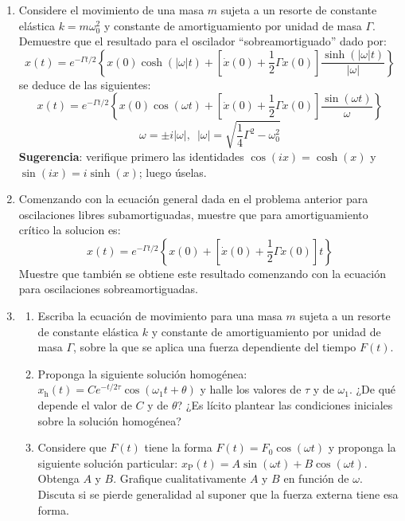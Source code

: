 \documentclass[11pt,spanish]{article}
\begin{document}
\begin{enumerate}
\begin{enumerate}
    \end{enumerate}



    \item Considere el movimiento de una masa $m$ sujeta a un resorte
    de constante elástica $k=m\omega_{0}^{2}$ y constante de
    amortiguamiento por unidad de masa $\Gamma$. Demuestre que el
    resultado para el oscilador ``sobreamortiguado'' dado por:
    \[
    x(t)=e^{-\Gamma t/2}\left\{ x(0)\cosh(\left|\omega\right|t) + \left[\dot{x}(0)+\frac{1}{2}\Gamma x(0)\right]\frac{\sinh(\left|\omega\right|t)}{\left|\omega\right|}\right\} 
    \]
    se deduce de las siguientes:
    \[
    x(t)=e^{-\Gamma t/2}\left\{ x(0)\cos(\omega t)+\left[\dot{x}(0)+\frac{1}{2}\Gamma x(0)\right]\frac{\sin(\omega t)}{\omega}\right\} 
    \]
    \[
    \omega=\pm i\left|\omega\right|,\,\,\,\left|\omega\right|=\sqrt{\frac{1}{4}\Gamma^{2}-\omega_{0}^{2}}
    \]
    \textbf{Sugerencia}: verifique primero las identidades $\cos(ix)=\cosh(x)$
    y $\sin(ix)=i\sinh(x)$; luego úselas.


    \item Comenzando con la ecuación general dada en el problema
    anterior para oscilaciones libres subamortiguadas, muestre que
    para amortiguamiento crítico la solucion es:
    \[
    x(t)=e^{-\Gamma t/2}\left\{ x(0)+\left[\dot{x}(0)+\frac{1}{2}\Gamma x(0)\right]t\right\} 
    \]
    Muestre que también se obtiene este resultado comenzando con la
    ecuación para oscilaciones sobreamortiguadas.

    \item 
    \begin{enumerate}
        \item Escriba la ecuación de movimiento para una masa $m$ sujeta a un
        resorte de constante elástica $k$ y constante de amortiguamiento por
        unidad de masa $\Gamma$, sobre la que se aplica una fuerza dependiente
        del tiempo $F(t)$. 

        \item Proponga la siguiente solución homogénea:
        $x_\text{h}(t)=Ce^{-t/2\tau}\cos(\omega_{1}t+\theta)$ y halle los
        valores de $\tau$ y de $\omega_{1}$. ¿De qué depende el valor de $C$ y
        de $\theta$? ¿Es lícito plantear las condiciones iniciales sobre la
        solución homogénea?
        
        \item Considere que $F(t)$ tiene la forma $F(t)=F_{0}\cos(\omega t)$ y
        proponga la siguiente solución particular:
        $x_\text{P}(t)=A\sin(\omega t)+B\cos(\omega t)$. Obtenga $A$ y $B$.
        Grafique cualitativamente $A$ y $B$ en función de $\omega$. Discuta si
        se pierde generalidad al suponer que la fuerza externa tiene esa forma.


\end{enumerate}
\end{enumerate}
\end{document}
